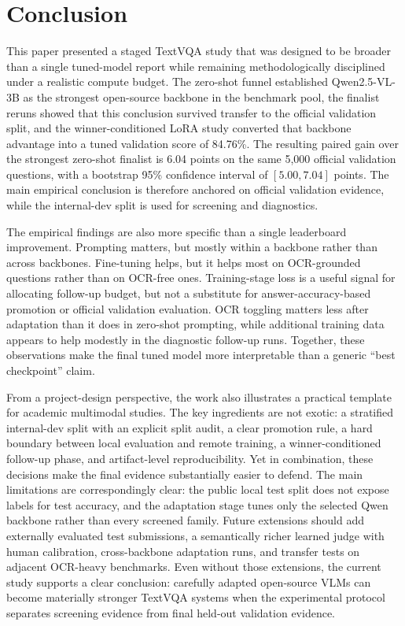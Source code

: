 \section{Conclusion}

This paper presented a staged TextVQA study that was designed to be broader than a single tuned-model report while remaining methodologically disciplined under a realistic compute budget. The zero-shot funnel established Qwen2.5-VL-3B as the strongest open-source backbone in the benchmark pool, the finalist reruns showed that this conclusion survived transfer to the official validation split, and the winner-conditioned LoRA study converted that backbone advantage into a tuned validation score of 84.76\%. The resulting paired gain over the strongest zero-shot finalist is 6.04 points on the same 5,000 official validation questions, with a bootstrap 95\% confidence interval of $[5.00, 7.04]$ points. The main empirical conclusion is therefore anchored on official validation evidence, while the internal-dev split is used for screening and diagnostics.

The empirical findings are also more specific than a single leaderboard improvement. Prompting matters, but mostly within a backbone rather than across backbones. Fine-tuning helps, but it helps most on OCR-grounded questions rather than on OCR-free ones. Training-stage loss is a useful signal for allocating follow-up budget, but not a substitute for answer-accuracy-based promotion or official validation evaluation. OCR toggling matters less after adaptation than it does in zero-shot prompting, while additional training data appears to help modestly in the diagnostic follow-up runs. Together, these observations make the final tuned model more interpretable than a generic ``best checkpoint'' claim.

From a project-design perspective, the work also illustrates a practical template for academic multimodal studies. The key ingredients are not exotic: a stratified internal-dev split with an explicit split audit, a clear promotion rule, a hard boundary between local evaluation and remote training, a winner-conditioned follow-up phase, and artifact-level reproducibility. Yet in combination, these decisions make the final evidence substantially easier to defend. The main limitations are correspondingly clear: the public local test split does not expose labels for test accuracy, and the adaptation stage tunes only the selected Qwen backbone rather than every screened family. Future extensions should add externally evaluated test submissions, a semantically richer learned judge with human calibration, cross-backbone adaptation runs, and transfer tests on adjacent OCR-heavy benchmarks. Even without those extensions, the current study supports a clear conclusion: carefully adapted open-source VLMs can become materially stronger TextVQA systems when the experimental protocol separates screening evidence from final held-out validation evidence.
